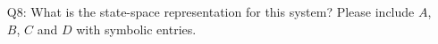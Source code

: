 \documentclass[12pt]{report}
\newcommand\drew[1]{\textcolor{red}{#1}}
\begin{document}
\begin{enumerate}[Question]
    \item[Q8:] What is the state-space representation for this system? Please include $A$, $B$, $C$ and $D$ with symbolic entries.\\
\end{enumerate}
\end{document}
